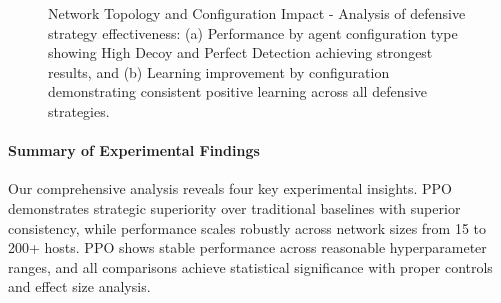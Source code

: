 \documentclass[12pt,oneside]{article}
\begin{document}
\begin{figure}[H]

\vspace{0.5cm}
\begin{center}
\end{center}
\caption{Network Topology and Configuration Impact - Analysis of defensive strategy effectiveness: (a) Performance by agent configuration type showing High Decoy and Perfect Detection achieving strongest results, and (b) Learning improvement by configuration demonstrating consistent positive learning across all defensive strategies.}
\label{fig:topology_analysis}
\end{figure}

\paragraph{Summary of Experimental Findings} Our comprehensive analysis reveals four key experimental insights. PPO demonstrates strategic superiority over traditional baselines with superior consistency, while performance scales robustly across network sizes from 15 to 200+ hosts. PPO shows stable performance across reasonable hyperparameter ranges, and all comparisons achieve statistical significance with proper controls and effect size analysis.
\end{document}
